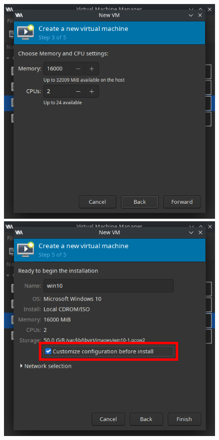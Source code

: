 \documentclass[12pt]{article}
\begin{document}
\begin{figure}[h]
	\centering
	\begin{minipage}[b]{0.27\textwidth}
		\includegraphics[width=1\textwidth]{images/vm-memory-setup.png}
	\end{minipage}
	\begin{minipage}[b]{0.27\textwidth}
		\includegraphics[width=1\textwidth]{images/vm-name.png}
	\end{minipage}
\end{figure}
\end{document}
